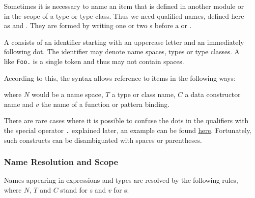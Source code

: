 Sometimes it is necessary to name an item that is defined in another
module or in the scope of a type or type class. Thus we need qualified
names, defined here as  and . They are formed
by writing one or two s before a  or .

A  consists of an identifier starting
with an uppercase letter and an immediately
following dot. The identifier may denote name spaces, types or type
classes. A  like \texttt{Foo.} is a single
token and thus may not contain spaces.

According to this, the syntax allows reference to items in the following ways:


where $N$ would be a name space, $T$ a type or class name, $C$ a
data constructor name and $v$ the name of a function or pattern binding.

There are rare cases where it is possible to confuse the dots in the qualifiers with
the special operator \texttt{.} explained later, an example can be found  \hyperref[confusedots]{here}. 
Fortunately, such constructs can be disambiguated with spaces or parentheses.



\subsubsection{Name Resolution and Scope}

Names appearing in expressions and types are resolved by the following rules, where $N$, $T$ and $C$ stand for s and $v$ for s:

